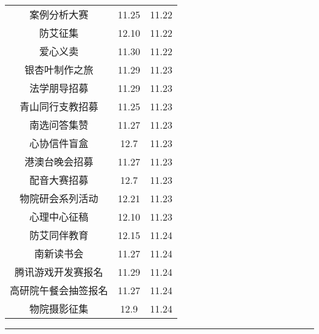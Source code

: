 \documentclass[letterpaper, 12pt]{article}
\begin{document}
\begin{multicols}{2}
{\begin{longtable}{|c|c|c|}
    案例分析大赛 & 11.25 & 11.22\\
    防艾征集 & 12.10 & 11.22\\
    爱心义卖 & 11.30 & 11.22\\
    银杏叶制作之旅 & 11.29 & 11.23\\
    法学朋导招募 & 11.29 & 11.23\\
    青山同行支教招募 & 11.25 & 11.23\\
    南选问答集赞 & 11.27 & 11.23\\
    心协信件盲盒 & 12.7 & 11.23\\
    港澳台晚会招募 & 11.27 & 11.23\\
    配音大赛招募 & 12.7 & 11.23\\
    物院研会系列活动 & 12.21 & 11.23\\
    心理中心征稿 & 12.10 & 11.23\\
    防艾同伴教育 & 12.15 & 11.24\\
    南新读书会 & 11.27 & 11.24\\
    腾讯游戏开发赛报名 & 11.29 & 11.24\\
    高研院午餐会抽签报名 & 11.27 & 11.24\\
    物院摄影征集 & 12.9 & 11.24\\
    \hline
\end{longtable}
\unskip
\unpenalty
\unpenalty}\unvbox\colbbox
\end{multicols}
\hrule
\pagebreak
\end{document}
